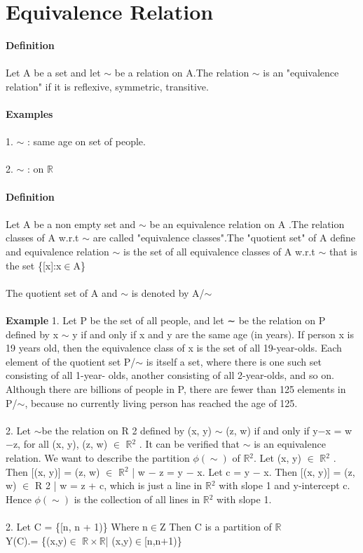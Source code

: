 \documentclass[a4paper,english,12pt]{article}
\begin{document}
\section{Equivalence Relation}
\textbf{Definition}\\\\
Let A be a set and let $\sim$ be a relation on A.The relation $\sim$ is an "equivalence relation" if it is reflexive, symmetric, transitive.\\\\
\textbf{Examples}\\\\
1. $\sim$ : same age on set of people.\\\\
2. $\sim$ : on $\mathbb{R}$\\\\
\textbf{Definition}\\\\
Let A be a non empty set and $\sim$ be an equivalence relation on A .The relation classes of A w.r.t $\sim$ are called "equivalence classes".The "quotient set" of A define and equivalence relation $\sim$ is the set of all equivalence classes of A w.r.t $\sim$ that is the set \{[x]:x$\in$A\}\\\\
The quotient set of A and $\sim$ is denoted by A/$\sim$\\\\
\textbf{Example}
1. Let P be the set of all people, and let ∼ be the relation on P defined
by x $\sim$ y if and only if x and y are the same age (in years). If person x is 19 years
old, then the equivalence class of x is the set of all 19-year-olds. Each element of the
quotient set P/$\sim$ is itself a set, where there is one such set consisting of all 1-year-
olds, another consisting of all 2-year-olds, and so on. Although there are billions of
people in P, there are fewer than 125 elements in P/$\sim$, because no currently living
person has reached the age of 125.\\\\
2. Let $\sim$be the relation on R 2 defined by (x, y) $\sim$ (z, w) if and only if y$-$x =
w$-$z, for all (x, y), (z, w) $\in$ $\mathbb{R}$$^2$ . It can be verified that $\sim$ is an equivalence relation. We
want to describe the partition $\phi(\sim)$ of $\mathbb{R}$$^2$. Let (x, y) $\in$ $\mathbb{R}$$^2$ . Then [(x, y)] = {(z, w) $\in$
$\mathbb{R}$$^2$ | w − z = y − x}. Let c = y − x. Then [(x, y)] = {(z, w) $\in$ R 2 | w = z + c}, which is
just a line in $\mathbb{R}$$^2$ with slope 1 and y-intercept c. Hence $\phi(\sim)$ is the collection of all
lines in $\mathbb{R}$$^2$ with slope 1.\\\\
2. Let C = \{[n, n + 1)\} Where n$\in$Z Then C is a partition of $\mathbb{R}$\\
Y(C).= \{(x,y)$\in$ $\mathbb{R}\times\mathbb{R}$| (x,y)$\in$[n,n$+$1)\}
  
\end{document}
